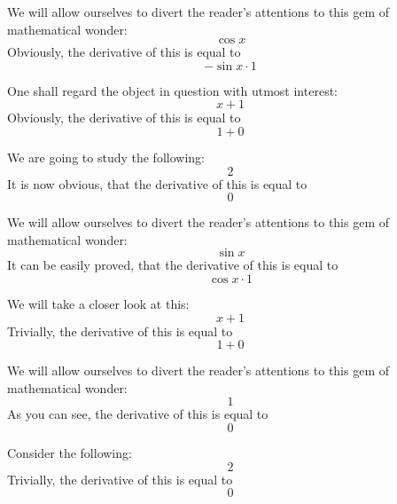 \documentclass{article}
\begin{document}
We will allow ourselves to divert the reader's attentions to this gem of mathematical wonder:
\begin{equation}
\cos x 
\end{equation}
Obviously, the derivative of this is equal to
\begin{equation}
-\sin x \cdot 1 
\end{equation}

One shall regard the object in question with utmost interest:
\begin{equation}
x + 1 
\end{equation}
Obviously, the derivative of this is equal to
\begin{equation}
1 + 0 
\end{equation}

We are going to study the following:
\begin{equation}
2 
\end{equation}
It is now obvious, that the derivative of this is equal to
\begin{equation}
0 
\end{equation}

We will allow ourselves to divert the reader's attentions to this gem of mathematical wonder:
\begin{equation}
\sin x 
\end{equation}
It can be easily proved, that the derivative of this is equal to
\begin{equation}
\cos x \cdot 1 
\end{equation}

We will take a closer look at this:
\begin{equation}
x + 1 
\end{equation}
Trivially, the derivative of this is equal to
\begin{equation}
1 + 0 
\end{equation}

We will allow ourselves to divert the reader's attentions to this gem of mathematical wonder:
\begin{equation}
1 
\end{equation}
As you can see, the derivative of this is equal to
\begin{equation}
0 
\end{equation}

Consider the following:
\begin{equation}
2 
\end{equation}
Trivially, the derivative of this is equal to
\begin{equation}
0 
\end{equation}
\end{document}
